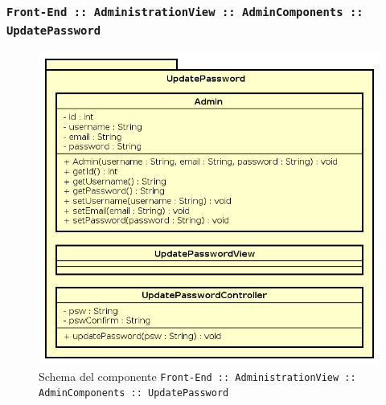 \documentclass[../DefinizioneDiProdotto.tex]{subfiles}
\begin{document}
	\newpage
	\subsubsection{ \texttt{Front-End :: AdministrationView :: AdminComponents :: UpdatePassword}}
		\begin{figure}[!h]
			\centering
			\includegraphics[scale=0.7]{Architettura/Front-End/Administration/AdminComponents/UpdatePassword.png}
			\caption{Schema del componente \texttt{Front-End :: AdministrationView :: AdminComponents :: UpdatePassword}}
		\end{figure}
\end{document}
